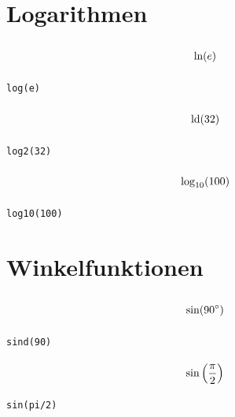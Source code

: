 \documentclass
[
  fontsize = 11pt,
  parskip  = half-,
  BCOR     = 0pt,
  DIV      = 11,
  ngerman
]
{scrartcl}
\begin{document}
\section{Logarithmen}
\begin{minipage}{\mw}
  \begin{equation*}
    \vphantom{\bigg(}%
    \ln(e)
  \end{equation*}
\end{minipage}%
\hfill
\begin{minipage}{\cw}
\begin{verbatim}
log(e)
\end{verbatim}
\end{minipage}
\begin{minipage}{\mw}
  \begin{equation*}
    \vphantom{\bigg(}%
    \operatorname{ld}(32)
  \end{equation*}
\end{minipage}%
\hfill
\begin{minipage}{\cw}
\begin{verbatim}
log2(32)
\end{verbatim}
\end{minipage}
\begin{minipage}{\mw}
  \begin{equation*}
    \vphantom{\bigg(}%
    \log_{10}(\num{100})
  \end{equation*}
\end{minipage}%
\hfill
\begin{minipage}{\cw}
\begin{verbatim}
log10(100)
\end{verbatim}
\end{minipage}

\section{Winkelfunktionen}
\begin{minipage}{\mw}
  \begin{equation*}
    \vphantom{\bigg(}%
    \sin(90^\circ)
  \end{equation*}
\end{minipage}%
\hfill
\begin{minipage}{\cw}
\begin{verbatim}
sind(90)
\end{verbatim}
\end{minipage}
\begin{minipage}{\mw}
  \begin{equation*}
    \vphantom{\bigg(}%
    \sin\left(\frac{\pi}{2}\right)
  \end{equation*}
\end{minipage}%
\hfill
\begin{minipage}{\cw}
\begin{verbatim}
sin(pi/2)
\end{verbatim}
\end{minipage}
\end{document}
